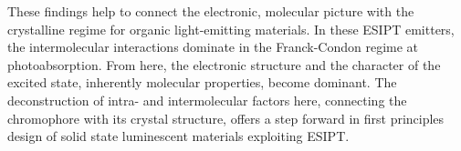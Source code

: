 These findings help to connect the electronic, molecular picture with the crystalline regime for organic light-emitting materials. In these ESIPT emitters, the intermolecular interactions dominate in the Franck-Condon regime at photoabsorption. From here, the electronic structure and the character of the excited state, inherently molecular properties, become dominant. The deconstruction of intra- and intermolecular factors here, connecting the chromophore with its crystal structure, offers a step forward in first principles design of solid state luminescent materials exploiting ESIPT.
